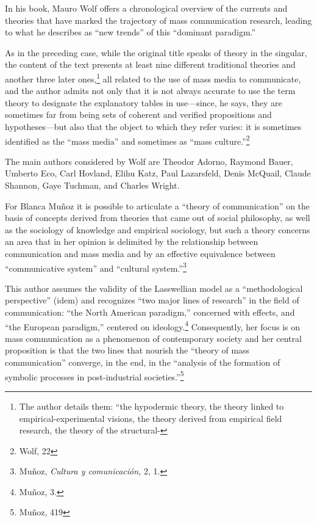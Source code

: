 \documentclass{tufte-handout}
\begin{document}
In his book, Mauro Wolf offers a chronological overview of the currents
and theories that have marked the trajectory of mass communication
research, leading to what he describes as ``new trends'' of this
``dominant paradigm.''

As in the preceding case, while the original title speaks of theory in
the singular, the content of the text presents at least nine different
traditional theories and another three later ones,\footnote{The author
  details them: ``the hypodermic theory, the theory linked to
  empirical-experimental visions, the theory derived from empirical
  field research, the theory of the structural-} all
related to the use of mass media to communicate, and the author admits
not only that it is not always accurate to use the term theory to
designate the explanatory tables in use---since, he says, they are
sometimes far from being sets of coherent and verified propositions and
hypotheses---but also that the object to which they refer varies: it is
sometimes identified as the ``mass media'' and sometimes as ``mass
culture.''\footnote{Wolf, 22}

The main authors considered by Wolf are Theodor Adorno, Raymond Bauer,
Umberto Eco, Carl Hovland, Elihu Katz, Paul Lazarsfeld, Denis McQuail,
Claude Shannon, Gaye Tuchman, and Charles Wright.

For Blanca Muñoz it is possible to articulate a ``theory of
communication'' on the basis of concepts derived from theories that came
out of social philosophy, as well as the sociology of knowledge and
empirical sociology, but such a theory concerns an area that in her
opinion is delimited by the relationship between communication and mass
media and by an effective equivalence between ``communicative system''
and ``cultural system.''\footnote{Muñoz, \emph{Cultura y comunicación,}
  2, 1.}

This author assumes the validity of the Lasswellian model as a
``methodological perspective'' (idem) and recognizes ``two major lines
of research'' in the field of communication: ``the North American
paradigm,'' concerned with effects, and ``the European paradigm,''
centered on ideology.\footnote{Muñoz, 3.} Consequently, her focus is on
mass communication as a phenomenon of contemporary society and her
central proposition is that the two lines that nourish the ``theory of
mass communication'' converge, in the end, in the ``analysis of the
formation of symbolic processes in post-industrial
societies.''\footnote{Muñoz, 419}
\end{document}
